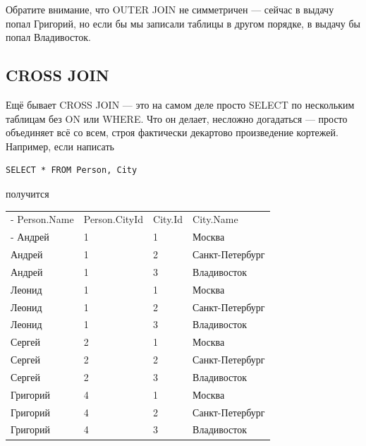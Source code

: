 \documentclass[a5paper]{article}
\begin{document}
Обратите внимание, что OUTER JOIN не симметричен --- сейчас в выдачу попал Григорий, но если бы мы записали таблицы в другом порядке, в выдачу бы попал Владивосток.

\subsection{CROSS JOIN}

Ещё бывает CROSS JOIN --- это на самом деле просто SELECT по нескольким таблицам без ON или WHERE. Что он делает, несложно догадаться --- просто объединяет всё со всем, строя фактически декартово произведение кортежей. Например, если написать

\begin{verbatim}
SELECT * FROM Person, City
\end{verbatim}

получится

\begin{center}
	\begin{tabu}{| X[1 l p] | X[1 l p] | X[1 l p] | X[1 l p] |}
		\tabucline-
		Person.Name  & Person.CityId  & City.Id  & City.Name       \\
		\tabucline-
		\everyrow{\tabucline-}
		Андрей       & 1              & 1        & Москва          \\
		Андрей       & 1              & 2        & Санкт-Петербург \\
		Андрей       & 1              & 3        & Владивосток     \\
		Леонид       & 1              & 1        & Москва          \\
		Леонид       & 1              & 2        & Санкт-Петербург \\
		Леонид       & 1              & 3        & Владивосток     \\
		Сергей       & 2              & 1        & Москва          \\
		Сергей       & 2              & 2        & Санкт-Петербург \\
		Сергей       & 2              & 3        & Владивосток     \\
		Григорий     & 4              & 1        & Москва          \\
		Григорий     & 4              & 2        & Санкт-Петербург \\
		Григорий     & 4              & 3        & Владивосток     \\
	\end{tabu}
\end{center}
\end{document}
